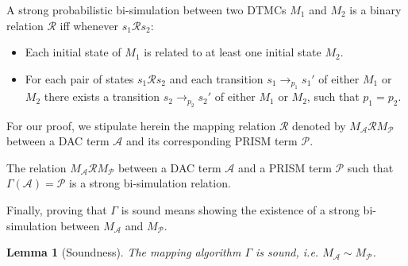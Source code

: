 \documentclass[3p,times,procedia,authoryear,round]{elsarticle}
\begin{document}
\begin{mydef}\label{strongb} A strong probabilistic
bi-simulation between two DTMCs $M_{1}$ and $M_{2}$ is a binary relation $\mathscr{R}$ iff whenever $s_{1}\mathscr{R}s_{2}$:

\begin{itemize}
	\item Each initial state of $M_{1}$ is related to at least one initial state $M_{2}$. 
			
	\item For each pair of states $s_{1}\mathscr{R}s_{2}$ and each transition  $s_{1} \rightarrow_{p_{1}} s_{1}'$ of either $M_{1}$ or $M_{2}$ there exists a transition $s_{2} \rightarrow_{p_{2}} s_{2}'$ of either $M_{1}$ or $M_{2}$, such that $p_{1} = p_{2}$.
    
\end{itemize}

\end{mydef}
For our proof, we stipulate herein the mapping relation $\mathscr{R}$ denoted by $M_{\mathscr{A}}\mathscr{R}M_{\mathscr{P}}$ between a DAC term $\mathscr{A}$ and its corresponding PRISM term $\mathscr{P}$.

\begin{mydef}\label{mappingR}  The relation $M_{\mathscr{A}}\mathscr{R}M_{\mathscr{P}}$  between a DAC term $\mathscr{A}$ and a PRISM term $\mathscr{P}$ such that $\Gamma(\mathscr{A})= \mathscr{P}$ is a strong bi-simulation relation.
\end{mydef}

Finally, proving that $\Gamma$ is sound means showing the existence of a strong bi-simulation between $M_{\mathscr{A}}$ and $M_{\mathscr{P}}$.

\newtheorem*{lem}{Lemma}
\begin{lem} [Soundness] The mapping algorithm $\Gamma$ is sound, \textsl{i.e.} $M_{\mathscr{A}}\sim M_{\mathscr{P}}$.\end{lem}

\end{document}
